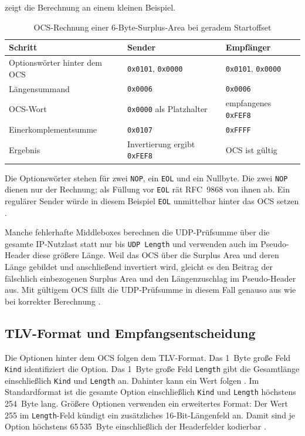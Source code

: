  zeigt die Berechnung an einem kleinen Beispiel.

\begin{table}[htbp]
  \centering
  \caption{OCS-Rechnung einer 6-Byte-Surplus-Area bei geradem Startoffset}
  \label{tab:ocs-rechenbeispiel}
  \small
  \begin{tabularx}{\textwidth}{@{}L{4.0cm}YY@{}}
    \toprule
    \textbf{Schritt} & \textbf{Sender} & \textbf{Empfänger} \\
    \midrule
    Optionswörter hinter dem OCS & \texttt{0x0101}, \texttt{0x0000}
      & \texttt{0x0101}, \texttt{0x0000} \\
    Längensummand & \texttt{0x0006} & \texttt{0x0006} \\
    OCS-Wort & \texttt{0x0000} als Platzhalter & empfangenes \texttt{0xFEF8} \\
    Einerkomplementsumme & \texttt{0x0107} & \texttt{0xFFFF} \\
    Ergebnis & Invertierung ergibt \texttt{0xFEF8} & OCS ist gültig \\
    \bottomrule
  \end{tabularx}
\end{table}

Die Optionswörter stehen für zwei \texttt{NOP}, ein \texttt{EOL} und ein Nullbyte. Die zwei \texttt{NOP}
dienen nur der Rechnung; als Füllung vor \texttt{EOL} rät RFC~9868 von ihnen ab. Ein regulärer Sender würde
in diesem Beispiel \texttt{EOL} unmittelbar hinter das OCS setzen \cite[Sec.~11.1]{rfc9868}.

Manche fehlerhafte Middleboxes berechnen die UDP-Prüfsumme über die gesamte IP-Nutzlast statt nur bis
\texttt{UDP Length} und verwenden auch im Pseudo-Header diese größere Länge. Weil das OCS über die Surplus
Area und deren Länge gebildet und anschließend invertiert wird, gleicht es den Beitrag der fälschlich
einbezogenen Surplus Area und den Längenzuschlag im Pseudo-Header aus. Mit gültigem OCS fällt die
UDP-Prüfsumme in diesem Fall genauso aus wie bei korrekter Berechnung \cite[Sec.~9]{rfc9868}.

\subsection{TLV-Format und Empfangsentscheidung}
\label{subsec:surplus-tlv}

Die Optionen hinter dem OCS folgen dem TLV-Format. Das 1~Byte große Feld \texttt{Kind} identifiziert die
Option. Das 1~Byte große Feld \texttt{Length} gibt die Gesamtlänge einschließlich \texttt{Kind} und
\texttt{Length} an. Dahinter kann ein Wert folgen \cite[Sec.~8 und 10]{rfc9868}. Im Standardformat ist die
gesamte Option einschließlich \texttt{Kind} und \texttt{Length} höchstens 254~Byte lang. Größere Optionen
verwenden ein erweitertes Format: Der Wert 255 im \texttt{Length}-Feld kündigt ein zusätzliches
16-Bit-Längenfeld an. Damit sind je Option höchstens 65\,535~Byte einschließlich der Headerfelder kodierbar
\cite[Sec.~10]{rfc9868}.

